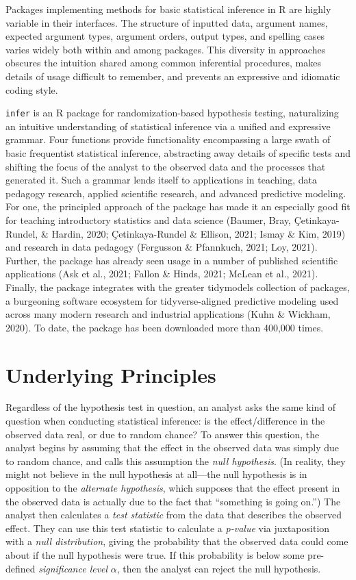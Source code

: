 \documentclass[10pt,a4paper,onecolumn]{article}
\begin{document}
Packages implementing methods for basic statistical inference in R are
highly variable in their interfaces. The structure of inputted data,
argument names, expected argument types, argument orders, output types,
and spelling cases varies widely both within and among packages. This
diversity in approaches obscures the intuition shared among common
inferential procedures, makes details of usage difficult to remember,
and prevents an expressive and idiomatic coding style.

\texttt{infer} is an R package for randomization-based hypothesis
testing, naturalizing an intuitive understanding of statistical
inference via a unified and expressive grammar. Four functions provide
functionality encompassing a large swath of basic frequentist
statistical inference, abstracting away details of specific tests and
shifting the focus of the analyst to the observed data and the processes
that generated it. Such a grammar lends itself to applications in
teaching, data pedagogy research, applied scientific research, and
advanced predictive modeling. For one, the principled approach of the
package has made it an especially good fit for teaching introductory
statistics and data science (Baumer, Bray, Çetinkaya-Rundel, \& Hardin,
2020; Çetinkaya-Rundel \& Ellison, 2021; Ismay \& Kim, 2019) and
research in data pedagogy (Fergusson \& Pfannkuch, 2021; Loy, 2021).
Further, the package has already seen usage in a number of published
scientific applications (Ask et al., 2021; Fallon \& Hinds, 2021; McLean
et al., 2021). Finally, the package integrates with the greater
tidymodels collection of packages, a burgeoning software ecosystem for
tidyverse-aligned predictive modeling used across many modern research
and industrial applications (Kuhn \& Wickham, 2020). To date, the
package has been downloaded more than 400,000 times.

\hypertarget{underlying-principles}{%
\section{Underlying Principles}\label{underlying-principles}}

Regardless of the hypothesis test in question, an analyst asks the same
kind of question when conducting statistical inference: is the
effect/difference in the observed data real, or due to random chance? To
answer this question, the analyst begins by assuming that the effect in
the observed data was simply due to random chance, and calls this
assumption the \emph{null hypothesis}. (In reality, they might not
believe in the null hypothesis at all---the null hypothesis is in
opposition to the \emph{alternate hypothesis}, which supposes that the
effect present in the observed data is actually due to the fact that
``something is going on.'') The analyst then calculates a \emph{test
statistic} from the data that describes the observed effect. They can
use this test statistic to calculate a \emph{p-value} via juxtaposition
with a \emph{null distribution}, giving the probability that the
observed data could come about if the null hypothesis were true. If this
probability is below some pre-defined \emph{significance level}
\(\alpha\), then the analyst can reject the null hypothesis.
\end{document}
